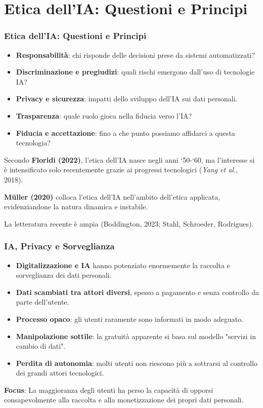 \documentclass{beamer}
\begin{document}
\section{Etica dell'IA: Questioni e Principi}
%
%
\begin{frame}
\frametitle{Etica dell'IA: Questioni e Principi}

\begin{itemize}
    \item \textbf{Responsabilità}: chi risponde delle decisioni prese da sistemi automatizzati?
    \item \textbf{Discriminazione e pregiudizi}: quali rischi emergono dall'uso di tecnologie IA?
    \item \textbf{Privacy e sicurezza}: impatti dello sviluppo dell’IA sui dati personali.
    \item \textbf{Trasparenza}: quale ruolo gioca nella fiducia verso l’IA?
    \item \textbf{Fiducia e accettazione}: fino a che punto possiamo affidarci a questa tecnologia?
\end{itemize}

\vspace{0.3cm}
{\small
Secondo \textbf{Floridi (2022)}, l’etica dell’IA nasce negli anni ‘50-‘60, ma l’interesse si è intensificato solo recentemente grazie ai progressi tecnologici (\textit{Yang et al.}, 2018).
}

\vspace{0.2cm}
{\small
\textbf{Müller (2020)} colloca l’etica dell’IA nell’ambito dell’etica applicata, evidenziandone la natura dinamica e instabile.
}

\vspace{0.2cm}
{\small
La letteratura recente è ampia (Boddington, 2023; Stahl, Schroeder, Rodrigues).
}
\end{frame}
%
%
\begin{frame}
\frametitle{IA, Privacy e Sorveglianza}

\begin{itemize}
    \item \textbf{Digitalizzazione e IA} hanno potenziato enormemente la raccolta e sorveglianza dei dati personali.
    \item \textbf{Dati scambiati tra attori diversi}, spesso a pagamento e senza controllo da parte dell’utente.
    \item \textbf{Processo opaco}: gli utenti raramente sono informati in modo adeguato.
    \item \textbf{Manipolazione sottile}: la gratuità apparente si basa sul modello "servizi in cambio di dati".
    \item \textbf{Perdita di autonomia}: molti utenti non riescono più a sottrarsi al controllo dei grandi attori tecnologici.
\end{itemize}

\vspace{0.4cm}
{\small
\textbf{Focus}: La maggioranza degli utenti ha perso la capacità di opporsi consapevolmente alla raccolta e alla monetizzazione dei propri dati personali.
}

\end{frame}
\end{document}

